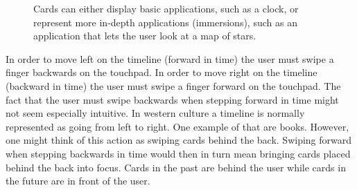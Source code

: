 	\begin{figure}[ht!]
		\centering
  	 \qquad
   	\qquad
   	\qquad
		\caption{Cards can either display basic applications, such as a clock, or represent more in-depth applications (immersions), such as an application that lets the user look at a map of stars.}
		\label{GoogleGlassCards}
	\end{figure}

In order to move left on the timeline (forward in time) the user must swipe a finger backwards on the touchpad. In order to move right on the timeline (backward in time) the user must swipe a finger forward on the touchpad. The fact that the user must swipe backwards when stepping forward in time might not seem especially intuitive. In western culture a timeline is normally represented as going from left to right. One example of that are books. However, one might think of this action as swiping cards behind the back. Swiping forward when stepping backwards in time would then in turn mean bringing cards placed behind the back into focus. Cards in the past are behind the user while cards in the future are in front of the user.

